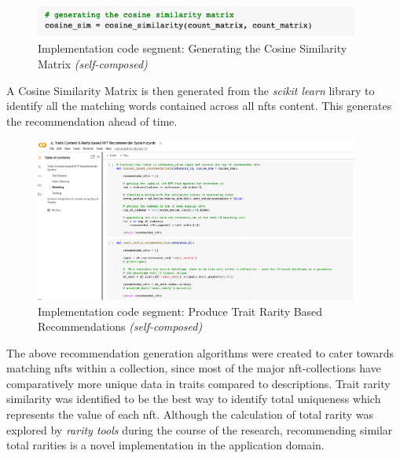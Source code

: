 \begin{figure}[h!]
\centering
\includegraphics[width=0.95\textwidth]{images/Implementation/code/cosine-matrix.png}
\caption{Implementation code segment: Generating the Cosine Similarity Matrix \textit{(self-composed)}}
\label{fig:code-cosine-matrix}
\end{figure}
A Cosine Similarity Matrix is then generated from the \textit{scikit learn} library to identify all the matching words contained across all \gls{nft}s content. This generates the recommendation ahead of time.

\begin{figure}[h!]
\centering
\includegraphics[width=0.95\textwidth]{images/Implementation/code/trait-rarity recommendations.png}
\caption{Implementation code segment: Produce Trait Rarity Based Recommendations \textit{(self-composed)}}
\label{fig:code-trait-rarity-rec}
\end{figure}

The above recommendation generation algorithms were created to cater towards matching \gls{nft}s within a collection, since most of the major \gls{nft}-collections have comparatively more unique data in traits compared to descriptions. Trait rarity similarity was identified to be the best way to identify total uniqueness which represents the value of each \gls{nft}. Although the calculation of total rarity was explored by \textit{rarity tools} during the course of the research, recommending similar total rarities is a novel implementation in the application domain.

